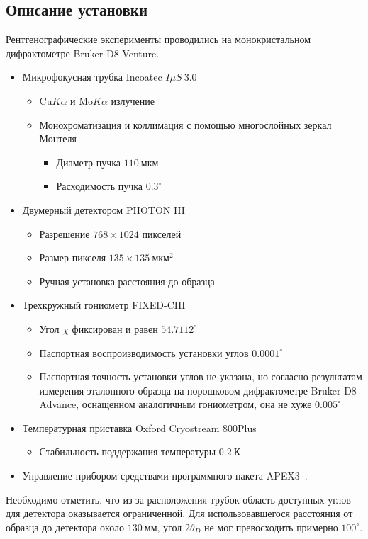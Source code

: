 \documentclass[a4paper,14pt]{extarticle}
\newcommand{\unit}[1]{ \ \text{#1}}
\newcommand{\degree}{^\circ}
\begin{document}
\subsection{Описание установки}
Рентгенографические эксперименты проводились на монокристальном дифрактометре Bruker D8 Venture.
\begin{itemize}
    \item Микрофокусная трубка Incoatec $I \mu S \ 3.0$
    \begin{itemize}
        \item $\text{Cu} K\alpha$ и $\text{Mo} K\alpha$ излучение
        \item Монохроматизация и коллимация с помощью многослойных зеркал Монтеля
        \begin{itemize}
            \item Диаметр пучка $110\unit{мкм}$
            \item Расходимость пучка $0.3\degree$
        \end{itemize}
    \end{itemize}
    \item Двумерный детектором PHOTON III
    \begin{itemize}
        \item Разрешение $768 \times 1024$ пикселей
        \item Размер пикселя $135 \times 135\unit{мкм}^2$
        \item Ручная установка расстояния до образца
    \end{itemize}
    \item Трехкружный гониометр FIXED-CHI
    \begin{itemize}
        \item Угол $\chi$ фиксирован и равен $54.7112\degree$
        \item Паспортная воспроизводимость установки углов $0.0001\degree$
        \item Паспортная точность установки углов не указана, но согласно результатам измерения эталонного образца на порошковом дифрактометре Bruker D8 Advance, оснащенном аналогичным гониометром, она не хуже $0.005\degree$
    \end{itemize}
    \item Температурная приставка Oxford Cryostream 800Plus
    \begin{itemize}
            \item Стабильность поддержания температуры $0.2\unit{К}$
    \end{itemize}
    \item Управление прибором средствами программного пакета APEX3~\cite{Bruker:2019}.
\end{itemize}
Необходимо отметить, что из-за расположения трубок область доступных углов для детектора оказывается ограниченной.
Для использовавшегося расстояния от образца до детектора около $130\unit{мм}$, угол $2\theta_D$ не мог превосходить примерно $100\degree$.
\end{document}

